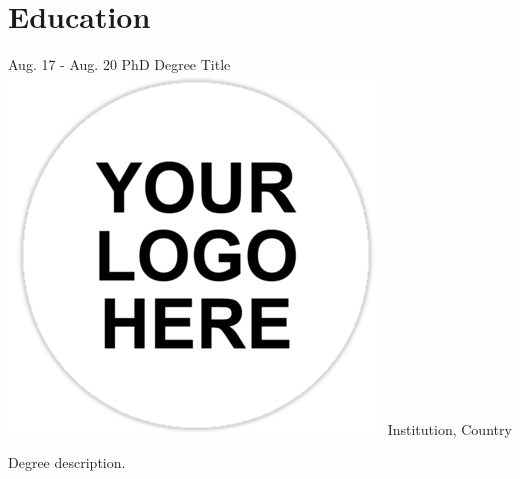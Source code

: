 \documentclass[american]{cv-class}
\begin{document}
\section{Education}
\begin{entrylist}
	\entry
	{Aug. 17 - Aug. 20}
	{PhD Degree Title}
	{{\includegraphics[scale=0.05]{img/generic-logo.png}} Institution, Country} 
	{\justifying Degree description.

	\href{https://yourCertificate.com}{}
   
}
\end{entrylist}
\end{document}
